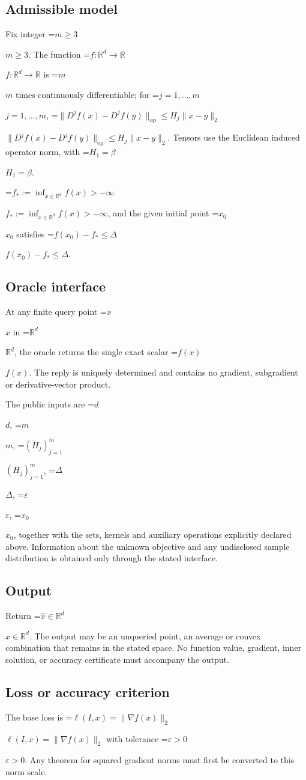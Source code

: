 \documentclass[10pt,a4paper]{article}
\newcommand{\AtlasMath}[1]{\par\begingroup\centering\setbox0=\hbox{$\displaystyle #1$}\ifdim\wd0>1.4\linewidth\typeout{ATLAS WIDE FORMULA: \the\wd0}\fi\ifdim\wd0>\linewidth\resizebox{\linewidth}{!}{\box0}\else\box0\fi\par\endgroup}
\newcommand{\AtlasInlineMath}[1]{\begingroup\setbox0=\hbox{$#1$}\ifdim\wd0>.4\linewidth\endgroup\AtlasMath{#1}\else\endgroup$#1$\fi}
\begin{document}
\subsection{Admissible model}
Fix integer \AtlasInlineMath{m\ge3}. The function \AtlasInlineMath{f:\mathbb{R}^d\to\mathbb{R}} is \AtlasInlineMath{m} times continuously differentiable; for \AtlasInlineMath{j=1,\ldots,m}, \AtlasInlineMath{\|D^jf(x)-D^jf(y)\|_{\mathrm{op}}\le H_j\|x-y\|_2}. Tensors use the Euclidean induced operator norm, with \AtlasInlineMath{H_1=\beta}.

\AtlasInlineMath{f_*:=\inf_{x\in\mathbb{R}^d}f(x)>-\infty}, and the given initial point \AtlasInlineMath{x_0} satisfies \AtlasInlineMath{f(x_0)-f_*\le\Delta}.

\subsection{Oracle interface}
At any finite query point \AtlasInlineMath{x} in \AtlasInlineMath{\mathbb{R}^d}, the oracle returns the single exact scalar \AtlasInlineMath{f(x)}. The reply is uniquely determined and contains no gradient, subgradient or derivative-vector product.

The public inputs are \AtlasInlineMath{d}, \AtlasInlineMath{m}, \AtlasInlineMath{(H_j)_{j=1}^m}, \AtlasInlineMath{\Delta}, \AtlasInlineMath{\varepsilon}, \AtlasInlineMath{x_0}, together with the sets, kernels and auxiliary operations explicitly declared above. Information about the unknown objective and any undisclosed sample distribution is obtained only through the stated interface.

\subsection{Output}
Return \AtlasInlineMath{\widehat{x}\in \mathbb{R}^d}. The output may be an unqueried point, an average or convex combination that remains in the stated space. No function value, gradient, inner solution, or accuracy certificate must accompany the output.

\subsection{Loss or accuracy criterion}
The base loss is \AtlasInlineMath{\ell(I,x)=\|\nabla f(x)\|_2} with tolerance \AtlasInlineMath{\varepsilon>0}. Any theorem for squared gradient norms must first be converted to this norm scale.
\end{document}
